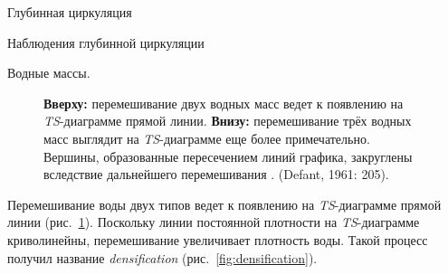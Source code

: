 \begin{chapter}{Глубинная циркуляция}
\begin{section}{Наблюдения глубинной циркуляции}
\begin{paragraph}{Водные массы.}
\begin{figure}[t!]
\caption{\textbf{Вверху:} перемешивание двух водных масс ведет к появлению
на \emph{TS}-диаграмме прямой линии. 
\textbf{Внизу:} перемешивание трёх водных масс выглядит на \emph{TS}-диаграмме
еще более примечательно. Вершины, образованные пересечением линий графика,
закруглены вследствие дальнейшего перемешивания%
. (Defant, 1961: 205).}
\label{fig:TSsketch}
\end{figure}
%

Перемешивание воды двух типов ведет к 
появлению на \emph{TS}-диаграмме прямой линии (рис.~\ref{fig:TSsketch}). 
Поскольку линии постоянной плотности на \emph{TS}-диаграмме криволинейны,
перемешивание увеличивает плотность
воды. Такой процесс получил название 
\emph{densification} 
(рис.~\ref{fig:densification}).
%
\end{paragraph}


\end{section}
\end{chapter}
